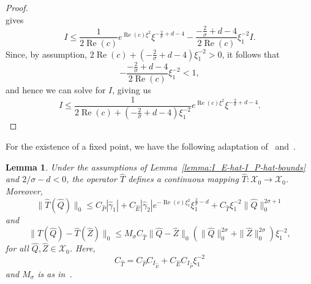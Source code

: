 \documentclass[11pt]{article}
\DeclareMathOperator{\real}{Re}
\newcommand{\Space}{\mathcal{X}}
\newtheorem{lemma}[definition]{Lemma}
\begin{document}
\begin{proof}
\begin{equation*}
  \end{equation*}
  gives
  \begin{equation*}
    I \leq \frac{1}{2\real(c)}e^{\real(c)\xi^{2}}\xi^{-\frac{2}{\sigma} + d - 4}
    - \frac{-\frac{2}{\sigma} + d - 4}{2\real(c)}\xi_{1}^{-2}I.
  \end{equation*}
  Since, by assumption,
  \(2\real(c) + \left(-\frac{2}{\sigma} + d - 4\right)\xi_{1}^{-2} >
  0\), it follows that
  \begin{equation*}
    -\frac{-\frac{2}{\sigma} + d - 4}{2\real(c)}\xi_{1}^{-2} < 1,
  \end{equation*}
  and hence we can solve for \(I\), giving us
  \begin{equation*}
    I \leq \frac{1}{2\real(c) + (-\frac{2}{\sigma} + d - 4)\xi_{1}^{-2}}e^{\real(c)\xi^{2}}\xi^{-\frac{2}{\sigma} + d - 4}.
  \end{equation*}
\end{proof}

For the existence of a fixed point, we have the following adaptation
of~\cite[Lemma~A.2]{Plech2001} and~\cite[Lemma~7.4]{Dahne2024}.

\begin{lemma}\label{lemma:Q-hat-fixed-point-bounds}
  Under the assumptions of Lemma~\ref{lemma:I_E-hat-I_P-hat-bounds}
  and \(2 / \sigma - d < 0\), the operator \(\hat{T}\) defines a
  continuous mapping \(\hat{T} \colon \Space_{0} \to \Space_{0}\).
  Moreover,
  \begin{equation}\label{eq:T-1-hat}
    \|\hat{T}(\hat{Q})\|_{0}
    \leq C_{\hat{P}}|\hat{\gamma}_{1}|
    + C_{\hat{E}}|\hat{\gamma}_{2}|e^{-\real(c)\xi_{1}^{2}}\xi_{1}^{\frac{2}{\sigma} - d}
    + C_{\hat{T}}\xi_{1}^{-2}\|\hat{Q}\|_{0}^{2\sigma + 1}
  \end{equation}
  and
  \begin{equation}\label{eq:T-2-hat}
    \|\hat{T}(\hat{Q}) - \hat{T}(\hat{Z})\|_{0} \leq M_{\sigma}C_{\hat{T}}\|\hat{Q} - \hat{Z}\|_{0}(\|\hat{Q}\|_{0}^{2\sigma} + \|\hat{Z}\|_{0}^{2\sigma})\xi_{1}^{-2},
  \end{equation}
  for all \(\hat{Q}, \hat{Z} \in \Space_{0}\). Here,
  \begin{equation*}
    C_{\hat{T}} = C_{\hat{P}}C_{I_{\hat{E}}} + C_{\hat{E}}C_{I_{\hat{P}}}\xi_{1}^{-2}
  \end{equation*}
  and \(M_{\sigma}\) is as in~\cite[Lemma~A.7]{Dahne2024}.
\end{lemma}
\end{document}
